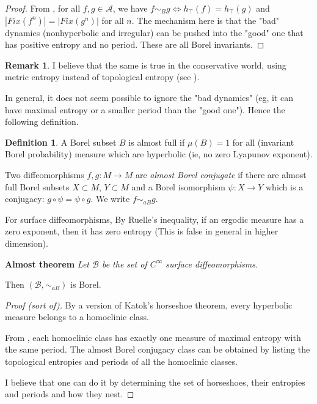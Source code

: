 \documentclass{article}
\theoremstyle{definition}
\newtheorem{definition}[theorem]{Definition}
\newtheorem{remark}[theorem]{Remark}
\begin{document}
\begin{proof}
From \cite{BCS}, for all $f,g\in\mathscr A$, we have $f\sim_B g\iff h_\top(f)=h_\top(g)$ and $|Fix(f^n)|=|Fix(g^n)|$ for all $n$. The mechanism here is that the "bad" dynamics (nonhyperbolic and irregular) can be pushed into the "good" one that has positive entropy and no period. These are all Borel invariants.
\end{proof}

\begin{remark}
I believe that the same is true in the conservative world, using metric entropy instead of topological entropy (see \cite{HHTU}).
\end{remark}


In general, it does not seem possible to ignore the "bad dynamics" (eg, it can have maximal entropy or a smaller period than the "good one"). Hence the following definition.

\begin{definition}
A Borel subset $B$ is almost full if $\mu(B)=1$ for all (invariant Borel probability) measure which are hyperbolic (ie, no zero Lyapunov exponent).

Two diffeomorphisms $f,g:M\to M$ are \emph{almost Borel conjugate} if there are almost full Borel subsets $X\subset M$, $Y\subset M$ and a Borel isomorphism $\psi:X\to Y$ which is a conjugacy: $g\circ\psi=\psi\circ g$. We write $f\sim_{aB} g$.
\end{definition}

For surface diffeomorphisms, By Ruelle's inequality, if an ergodic measure has a zero exponent, then it has zero entropy (This is false in general in higher dimension).

\textbf{Almost theorem}
\textit{Let $\mathscr B$ be the set of $C^\infty$ surface diffeomorphisms.}

Then $(\mathscr B,\sim_{aB})$ is Borel.


\begin{proof}[Proof (sort of)]
By a version of Katok's horseshoe theorem, every hyperbolic measure belongs to a homoclinic class.
 
From \cite{BCS}, each homoclinic class has exactly one measure of maximal entropy with the same period. The almost Borel conjugacy class can be obtained by listing the topological entropies and periods of all the homoclinic classes.

I believe that one can do it by determining the set of horseshoes, their entropies and periods and how they nest.
\end{proof}
\end{document}
